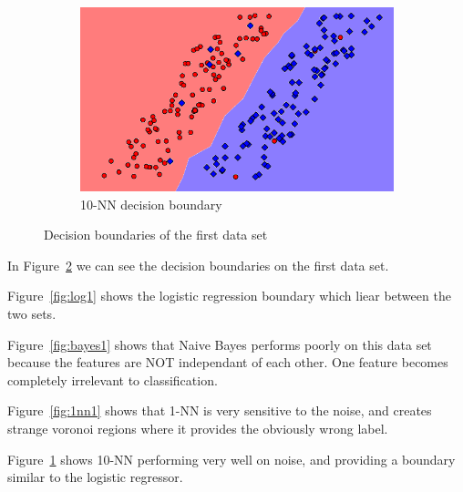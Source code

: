 \documentclass[letterpaper,10pt]{article} %
\begin{document}
\begin{figure}[h]
\begin{subfigure}[b]{\textwidth}
\includegraphics[width=\textwidth]{handout/q3-1-10NN}
\caption{10-NN decision boundary}
\label{fig:10nn1}
\end{subfigure}

\caption{Decision boundaries of the first data set}\label{fig:decision1}
\end{figure}

In Figure~\ref{fig:decision1} we can see the decision boundaries on the first data set. 

Figure~\ref{fig:log1} shows the logistic regression boundary which liear between the two sets. 

Figure~\ref{fig:bayes1} shows that Naive Bayes performs poorly on this data set because the features are NOT independant of each other. One feature becomes completely irrelevant to classification.

Figure~\ref{fig:1nn1} shows that 1-NN is very sensitive to the noise, and creates strange voronoi regions where it provides the obviously wrong label.

Figure~\ref{fig:10nn1} shows 10-NN performing very well on noise, and providing a boundary similar to the logistic regressor.
\end{document}
